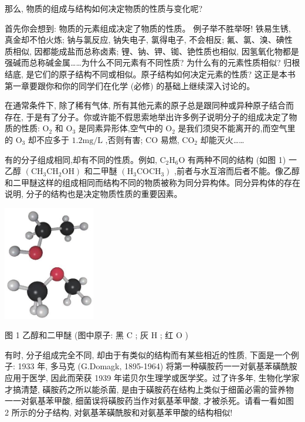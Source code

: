 \documentclass[10pt]{article}
\begin{document}
那么, 物质的组成与结构如何决定物质的性质与变化呢?

首先你会想到: 物质的元素组成决定了物质的性质。 例子举不胜举呀! 铁易生锈, 真金却不怕火炼; 钠与氯反应, 钠失电子, 氯得电子, 不会相反; 氟、氯、溴、碘性质相似, 因都能成盐而总称卤素; 锂、钠、钾、铷、铯性质也相似, 因氢氧化物都是强碱而总称碱金属……为什么不同元素有不同性质? 为什么有的元素性质相似? 归根结底, 是它们的原子结构不同或相似。原子结构如何决定元素的性质? 这正是本书第一章要跟你和你的同学们在化学 (必修) 的基础上继续深入讨论的。

在通常条件下, 除了稀有气体, 所有其他元素的原子总是跟同种或异种原子结合而存在, 于是有了分子。你或许能不假思索地举出许多例子说明分子的组成决定了物质的性质: \({\mathrm{O}}_{2}\) 和 \({\mathrm{O}}_{3}\) 是同素异形体,空气中的 \({\mathrm{O}}_{2}\) 是我们须臾不能离开的,而空气里的 \({\mathrm{O}}_{3}\) 却不应多于 \({1.2}\mathrm{{mg}}/\mathrm{L}\) ,否则有害; \(\mathrm{{CO}}\) 易燃, \({\mathrm{{CO}}}_{2}\) 却能灭火……

有的分子组成相同,却有不同的性质。例如, \({\mathrm{C}}_{2}{\mathrm{H}}_{6}\mathrm{O}\) 有两种不同的结构 (如图 1) 一乙醇 \(\left( {{\mathrm{{CH}}}_{3}{\mathrm{{CH}}}_{2}\mathrm{{OH}}}\right)\) 和二甲醚 \(\left( {{\mathrm{H}}_{3}{\mathrm{{COCH}}}_{3}}\right)\) ,前者与水互溶而后者不能。像乙醇和二甲醚这样的组成相同而结构不同的物质被称为同分异构体。同分异构体的存在说明, 分子的结构也是决定物质性质的重要因素。

\begin{center}
\includegraphics[max width=0.3\textwidth]{images/0190e026-5a11-7df7-bd27-54d09026ba7a_6_374137.jpg}
\end{center}

图 1 乙醇和二甲醚 (图中原子: 黑 \(\mathrm{C}\) ; 灰 \(\mathrm{H}\) ; 红 \(\mathrm{O}\) )

有时, 分子组成完全不同, 却由于有类似的结构而有某些相近的性质, 下面是一个例子: 1933 年, 多马克 (G.Domagk, 1895-1964) 将第一种磺胺药一一对氨基苯磺酰胺应用于医学, 因此而荣获 1939 年诺贝尔生理学或医学奖。过了许多年, 生物化学家才搞清楚, 磺胺药之所以能杀菌, 是由于磺胺药在结构上类似于细菌必需的营养物一一对氨基苯甲酸, 细菌误将磺胺药当作对氨基苯甲酸, 才被杀死。请看一看如图 2 所示的分子结构, 对氨基苯磺酰胺和对氨基苯甲酸的结构相似!
\end{document}
